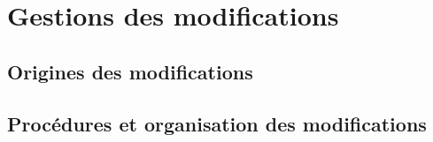 \section{Gestions des modifications}

\subsection{Origines des modifications}


\subsection{Procédures et organisation des modifications}


